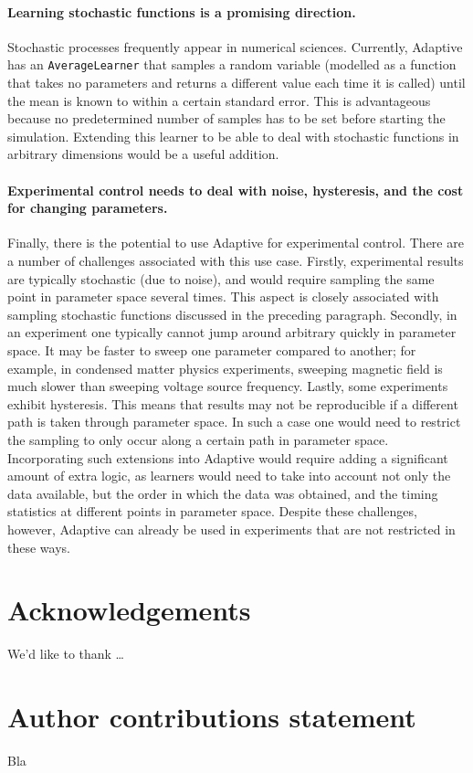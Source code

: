 \documentclass[english, twocolumn, 10pt, aps, superscriptaddress, floatfix, prb, citeautoscript]{revtex4-1}
\newcommand{\passthrough}[1]{\lstset{mathescape=false}#1\lstset{mathescape=true}}
\begin{document}
\paragraph{Learning stochastic functions is a promising direction.}

Stochastic processes frequently appear in numerical sciences.
Currently, Adaptive has an \passthrough{\lstinline!AverageLearner!} that samples a random variable (modelled as a function that takes no parameters and returns a different value each time it is called) until the mean is known to within a certain standard error.
This is advantageous because no predetermined number of samples has to be set before starting the simulation.
Extending this learner to be able to deal with stochastic functions in arbitrary dimensions would be a useful addition.

\paragraph{Experimental control needs to deal with noise, hysteresis, and the cost for changing parameters.}

Finally, there is the potential to use Adaptive for experimental control.
There are a number of challenges associated with this use case.
Firstly, experimental results are typically stochastic (due to noise), and would require sampling the same point in parameter space several times.
This aspect is closely associated with sampling stochastic functions discussed in the preceding paragraph.
Secondly, in an experiment one typically cannot jump around arbitrary quickly in parameter space.
It may be faster to sweep one parameter compared to another; for example, in condensed matter physics experiments, sweeping magnetic field is much slower than sweeping voltage source frequency.
Lastly, some experiments exhibit hysteresis.
This means that results may not be reproducible if a different path is taken through parameter space.
In such a case one would need to restrict the sampling to only occur along a certain path in parameter space.
Incorporating such extensions into Adaptive would require adding a significant amount of extra logic, as learners would need to take into account not only the data available, but the order in which the data was obtained, and the timing statistics at different points in parameter space.
Despite these challenges, however, Adaptive can already be used in experiments that are not restricted in these ways.

\section*{Acknowledgements}
We'd like to thank \ldots{}

\section*{Author contributions statement}
Bla




\end{document}
